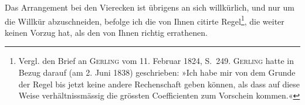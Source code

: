 Das Arrangement bei den Vierecken ist übrigens an sich willkürlich,
und nur um die Willkür abzuschneiden, befolge ich die von Ihnen citirte
Regel\def\letterfivestars{***}\footnote{Vergl. den Brief an \textsc{Gerling} vom 11. Februar 1824, S.\ 249. \textsc{Gerling} hatte in Bezug darauf
(am 2. Juni 1838) geschrieben: »Ich habe mir von dem Grunde der Regel bis jetzt keine andere Rechenschaft
geben können, als dass auf diese Weise verhältnissmässig die grössten Coefficienten zum Vorschein
kommen.«}, die weiter keinen Vorzug hat, als den von Ihnen richtig errathenen.
\endgroup
